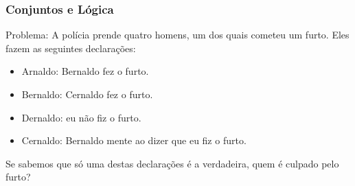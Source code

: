 \begin{frame}
	\frametitle{Conjuntos e Lógica}
	
	Problema: A polícia prende quatro homens, um dos quais cometeu um furto. Eles fazem as seguintes declarações:
	\begin{itemize}
		\item Arnaldo: Bernaldo fez o furto.
		\item Bernaldo: Cernaldo fez o furto.
		\item Dernaldo: eu não fiz o furto.
		\item Cernaldo: Bernaldo mente ao dizer que eu fiz o furto.
	\end{itemize}
	Se sabemos que só uma destas declarações é a verdadeira, quem é culpado pelo furto?
\end{frame}
